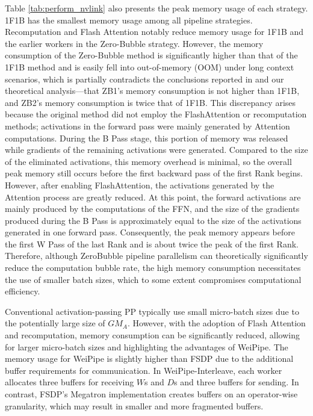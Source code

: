 \documentclass[sigplan,review]{acmart}
\begin{document}
Table \ref{tab:perform_nvlink} also presents the peak memory usage of each strategy. 1F1B has the smallest memory usage among all pipeline strategies. Recomputation and Flash Attention notably reduce memory usage for 1F1B and the earlier workers in the Zero-Bubble strategy. However, the memory consumption of the Zero-Bubble method is significantly higher than that of the 1F1B method and is easily fell into out-of-memory (OOM) under long context scenarios, which is partially contradicts the conclusions reported in \cite{qi2023zerobubblepipelineparallelism} and our theoretical analysis—that ZB1's memory consumption is not higher than 1F1B, and ZB2's memory consumption is twice that of 1F1B. This discrepancy arises because the original method did not employ the FlashAttention or recomputation methods; activations in the forward pass were mainly generated by Attention computations. During the B Pass stage, this portion of memory was released while gradients of the remaining activations were generated. Compared to the size of the eliminated activations, this memory overhead is minimal, so the overall peak memory still occurs before the first backward pass of the first Rank begins. However, after enabling FlashAttention, the activations generated by the Attention process are greatly reduced. At this point, the forward activations are mainly produced by the computations of the FFN, and the size of the gradients produced during the B Pass is approximately equal to the size of the activations generated in one forward pass. Consequently, the peak memory appears before the first W Pass of the last Rank and is about twice the peak of the first Rank. Therefore, although ZeroBubble pipeline parallelism can theoretically significantly reduce the computation bubble rate, the high memory consumption necessitates the use of smaller batch sizes, which to some extent compromises computational efficiency.

Conventional activation-passing PP typically use small micro-batch sizes due to the potentially large size of $GM_A$. However, with the adoption of Flash Attention and recomputation, memory consumption can be significantly reduced, allowing for larger micro-batch sizes and highlighting the advantages of WeiPipe. The memory usage for WeiPipe is slightly higher than FSDP due to the additional buffer requirements for communication. In WeiPipe-Interleave, each worker allocates three buffers for receiving $W$s and $D$s and three buffers for sending. In contrast, FSDP's Megatron implementation creates buffers on an operator-wise granularity, which may result in smaller and more fragmented buffers.
\end{document}
